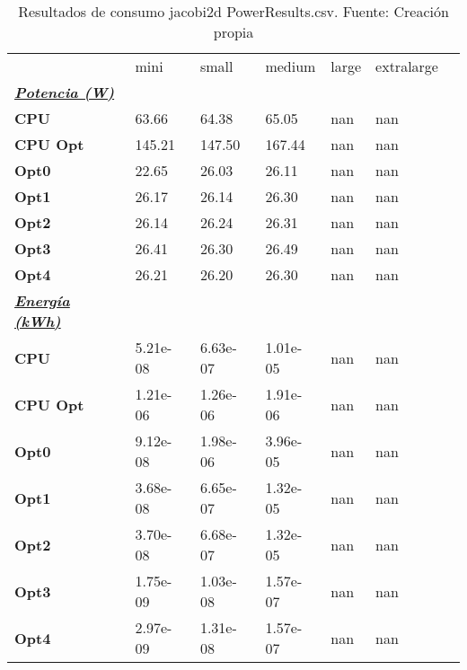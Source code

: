 \begin{table}[H]
    \centering
    \begin{tabular}{lllllll}
    \rowcolor[HTML]{DAE8FC} \ & mini & small & medium & 	large & 	extralarge \\
    \cellcolor[HTML]{DAE8FC} \textbf{\textbf{{\emph{{\underline{{Potencia (W)}}}}}}} &  &  &  & 	 & 	 \\
    \rowcolor[HTML]{EFEFEF} \cellcolor[HTML]{DAE8FC} \textbf{CPU} & 63.66 & 64.38 & 65.05 & 	nan & 	nan \\
    \cellcolor[HTML]{DAE8FC} \textbf{CPU Opt} & 145.21 & 147.50 & 167.44 & 	nan & 	nan \\
    \rowcolor[HTML]{EFEFEF} \cellcolor[HTML]{DAE8FC} \textbf{Opt0} & 22.65 & 26.03 & 26.11 & 	nan & 	nan \\
    \cellcolor[HTML]{DAE8FC} \textbf{Opt1} & 26.17 & 26.14 & 26.30 & 	nan & 	nan \\
    \rowcolor[HTML]{EFEFEF} \cellcolor[HTML]{DAE8FC} \textbf{Opt2} & 26.14 & 26.24 & 26.31 & 	nan & 	nan \\
    \cellcolor[HTML]{DAE8FC} \textbf{Opt3} & 26.41 & 26.30 & 26.49 & 	nan & 	nan \\
    \rowcolor[HTML]{EFEFEF} \cellcolor[HTML]{DAE8FC} \textbf{Opt4} & 26.21 & 26.20 & 26.30 & 	nan & 	nan \\
    \cellcolor[HTML]{DAE8FC} \textbf{\textbf{{\emph{{\underline{{Energía (kWh)}}}}}}} &  &  &  & 	 & 	 \\
    \rowcolor[HTML]{EFEFEF} \cellcolor[HTML]{DAE8FC} \textbf{CPU} & 5.21e-08 & 6.63e-07 & 1.01e-05 & 	nan & 	nan \\
    \cellcolor[HTML]{DAE8FC} \textbf{CPU Opt} & 1.21e-06 & 1.26e-06 & 1.91e-06 & 	nan & 	nan \\
    \rowcolor[HTML]{EFEFEF} \cellcolor[HTML]{DAE8FC} \textbf{Opt0} & 9.12e-08 & 1.98e-06 & 3.96e-05 & 	nan & 	nan \\
    \cellcolor[HTML]{DAE8FC} \textbf{Opt1} & 3.68e-08 & 6.65e-07 & 1.32e-05 & 	nan & 	nan \\
    \rowcolor[HTML]{EFEFEF} \cellcolor[HTML]{DAE8FC} \textbf{Opt2} & 3.70e-08 & 6.68e-07 & 1.32e-05 & 	nan & 	nan \\
    \cellcolor[HTML]{DAE8FC} \textbf{Opt3} & 1.75e-09 & 1.03e-08 & 1.57e-07 & 	nan & 	nan \\
    \rowcolor[HTML]{EFEFEF} \cellcolor[HTML]{DAE8FC} \textbf{Opt4} & 2.97e-09 & 1.31e-08 & 1.57e-07 & 	nan & 	nan \\
    \end{tabular}
    \caption[Resultados de consumo jacobi2d PowerResults.csv]{{Resultados de consumo jacobi2d PowerResults.csv. Fuente: Creación propia}}
    \label{table_global_jacobi2d_PowerResults_data}
\end{table}
